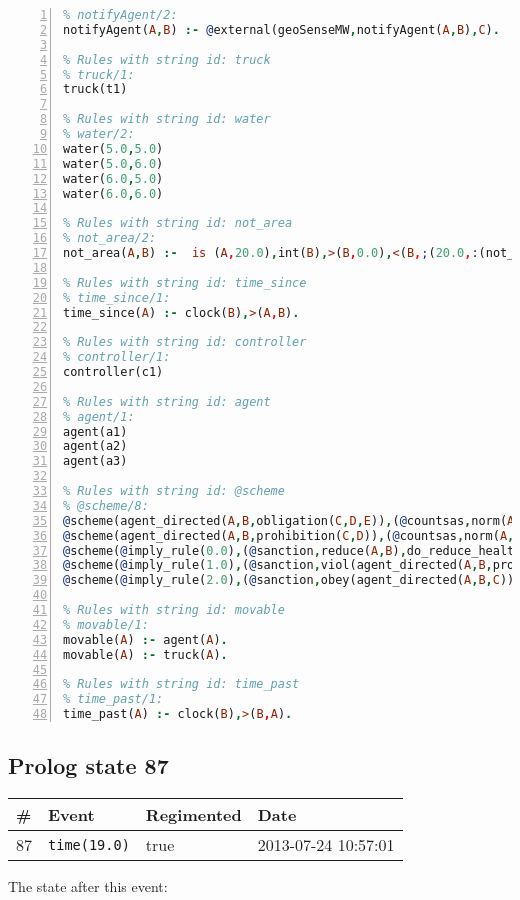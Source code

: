 \documentclass[11pt]{article}\usepackage[utf8]{inputenc}\usepackage{geometry}
\begin{document}
\begin{lstlisting}[language=Prolog, numbers=left]
% Rules with string id: notifyAgent
% notifyAgent/2:
notifyAgent(A,B) :- @external(geoSenseMW,notifyAgent(A,B),C).

% Rules with string id: truck
% truck/1:
truck(t1)

% Rules with string id: water
% water/2:
water(5.0,5.0)
water(5.0,6.0)
water(6.0,5.0)
water(6.0,6.0)

% Rules with string id: not_area
% not_area/2:
not_area(A,B) :-  is (A,20.0),int(B),>(B,0.0),<(B,;(20.0,:(not_area(A,B), is (-(B),20.0)))),int(A),>(A,0.0),<(A,;(20.0,:(area(A,B),-(int(A))))),int(B),>(A,0.0),>(B,0.0),<(A,21.0),<(B,21.0).

% Rules with string id: time_since
% time_since/1:
time_since(A) :- clock(B),>(A,B).

% Rules with string id: controller
% controller/1:
controller(c1)

% Rules with string id: agent
% agent/1:
agent(a1)
agent(a2)
agent(a3)

% Rules with string id: @scheme
% @scheme/8:
@scheme(agent_directed(A,B,obligation(C,D,E)),(@countsas,norm(A,B,F,obligation(C,D,E)),F),false,(listTrue(C)),(time_past(D)),false,[plus(viol(agent_directed(A,B,obligation(C,D,E))))|[]],[plus(obey(agent_directed(A,B,obligation(C,D,E))))|[]])
@scheme(agent_directed(A,B,prohibition(C,D)),(@countsas,norm(A,B,E,prohibition(C,D)),E),(listTrue(C)),false,(false),false,[plus(viol(agent_directed(A,B,prohibition(C,D))))|[]],[plus(obey(agent_directed(A,B,prohibition(C,D))))|[]])
@scheme(@imply_rule(0.0),(@sanction,reduce(A,B),do_reduce_health(A,B),notifyAgent(A,changed(status))),true,false,false,false,[min(reduce(A,B))|[]],[])
@scheme(@imply_rule(1.0),(@sanction,viol(agent_directed(A,B,prohibition(C,D))),do_sanction(D)),true,false,false,false,[min(viol(agent_directed(A,B,prohibition(C,D))))|[]],[])
@scheme(@imply_rule(2.0),(@sanction,obey(agent_directed(A,B,C))),true,false,false,false,[min(obey(agent_directed(A,B,C)))|[]],[])

% Rules with string id: movable
% movable/1:
movable(A) :- agent(A).
movable(A) :- truck(A).

% Rules with string id: time_past
% time_past/1:
time_past(A) :- clock(B),>(B,A).

\end{lstlisting}
\clearpage 
\subsection{Prolog state 87}
\begin{table}[ht]
\centering 
\begin{tabular}{l l l l} 
\textbf{\#} & \textbf{Event} & \textbf{Regimented} & \textbf{Date} \\ [0.5ex] 
\hline
87&\texttt{time(19.0)}&true&2013-07-24 10:57:01\\ [1ex] \hline\end{tabular}
\end{table}
The state after this event:
\end{document}
